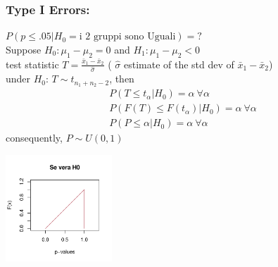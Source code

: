 \documentclass[xcolor={pdftex,dvipsnames,table}]{beamer}
\begin{document}
\begin{frame}
\frametitle{Type I Errors:}

$P(p\leq .05 | H_0=\textrm{i 2 gruppi sono Uguali})=?$\\
Suppose $H_0: \mu_1-\mu_2=0$ and $H_1: \mu_1-\mu_2<0$\\
test statistic $T=\frac{\bar{x}_1-\bar{x}_2}{\hat{\sigma}}$ ( $\hat{\sigma}$ estimate of the std dev of $\bar{x}_1-\bar{x}_2$)\\
under $H_0$: $T\sim t_{n_1+n_2-2}$, then\\
\begin{eqnarray*}
P(T\leq t_\alpha | H_0) =\alpha \ \forall \alpha\\
P(F(T)\leq F(t_\alpha) | H_0) =\alpha \ \forall \alpha\\
P(P \leq \alpha | H_0) =\alpha \ \forall \alpha
\end{eqnarray*}
consequently, $P\sim U(0,1)$
\begin{center}
\includegraphics[width=0.3\textwidth]{plaatjes/cdf_uniform}      
\end{center}
\end{frame}
\end{document}
